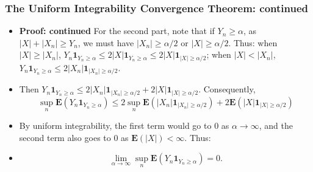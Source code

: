 \documentclass[handout]{beamer}
\newcommand{\BE}{\mathbf{E}}
\newcommand{\BI}{\mathbf{1}}
\begin{document}
\frame
{
  \frametitle{The Uniform Integrability Convergence Theorem: continued} 

   \begin{itemize}
   
  
                \item<1->\textbf{Proof: continued} For the second part, note that if $Y_n\geq \alpha$, as $|X|+|X_n|\geq Y_n$, we must have $|X_n|\geq \alpha/2$ or $|X|\geq \alpha/2$. Thus: 
                 when $|X|\geq |X_n|$, $Y_n\BI_{Y_n\geq \alpha}\leq 2|X| \BI_{Y_n\geq \alpha} \leq 2|X| \BI_{|X| \geq \alpha/2}$;  
                 when $|X|<|X_n|$, $Y_n\BI_{Y_n\geq \alpha}\leq 2|X_n| \BI_{|X_n| \geq \alpha/2}$. 
                                                                                             
                                       \item<2->[-] Then    $Y_n\BI_{Y_n\geq \alpha}\leq 2|X_n| \BI_{|X_n| \geq \alpha/2}+2|X| \BI_{|X| \geq \alpha/2}$. Consequently,                            
                                                                $$\sup_n \BE(Y_n\BI_{Y_n\geq \alpha})\leq 2\sup_n \BE( |X_n| \BI_{|X_n| \geq \alpha/2} )+2\BE( |X| \BI_{|X| \geq \alpha/2} )$$


\item<3->[-] By uniform integrability, the first term would go to 0 as $\alpha \rightarrow \infty$, and the second term also goes to 0 as $\BE(|X|)<\infty$. Thus:                        

\item<4->  $$\lim_{\alpha\rightarrow \infty } \sup_n \BE(Y_n\BI_{Y_n\geq \alpha})=0.$$                     
                                                                                                           
                              \end{itemize}
}
\end{document}
